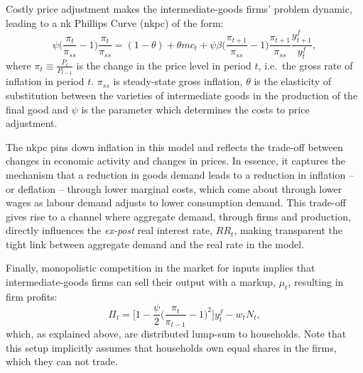 \documentclass[12pt]{article} %
\numberwithin{equation}{section} %
\numberwithin{figure}{section}
\numberwithin{table}{section}
\begin{document}
Costly price adjustment makes the intermediate-goods firms' problem dynamic, leading to a \Gls{nk} Phillips Curve (\Gls{nkpc}) of the form:
\begin{equation}
    \psi \Bigg( \frac{\pi_t}{\pi_{ss}} - 1 \Bigg) \frac{\pi_t}{\pi_{ss}} = (1-\theta) + \theta mc_t + \psi \beta \Bigg( \frac{\pi_{t+1}}{\pi_{ss}} - 1 \Bigg) \frac{\pi_{t+1}}{\pi_{ss}} \frac{y_{t+1}^f}{y_t^f}, \label{eq:firms-nkpc}
\end{equation}
where $\pi_t \equiv \frac{P_t}{P_{t-1}}$ is the change in the price level in period $t$, i.e.~the gross rate of inflation in period $t$. $\pi_{ss}$ is steady-state gross inflation, $\theta$ is the elasticity of substitution between the varieties of intermediate goods in the production of the final good and $\psi$ is the parameter which determines the costs to price adjustment.  


The \Gls{nkpc} pins down inflation in this model and reflects the trade-off between changes in economic activity and changes in prices. In essence, it captures the mechanism that a reduction in goods demand leads to a reduction in inflation -- or deflation -- through lower marginal costs, which come about through lower wages as labour demand adjusts to lower consumption demand. This trade-off gives rise to a channel where aggregate demand, through firms and production, directly influences the \textit{ex-post} real interest rate, $RR_t$, making transparent the tight link between aggregate demand and the real rate in the model.


Finally, monopolistic competition in the market for inputs implies that intermediate-goods firms can sell their output with a markup, $\mu_t$, resulting in firm profits:
\begin{equation}
    \Pi_t = \Bigg[ 1 - \frac{\psi}{2} \Bigg( \frac{\pi_t}{\pi_{t-1}} - 1 \Bigg)^2 \Bigg] y_t^f - w_t N_t, \label{eq:firms-profits}
\end{equation}
which, as explained above, are distributed lump-sum to households. Note that this setup implicitly assumes that households own equal shares in the firms, which they can not trade.
\end{document}
